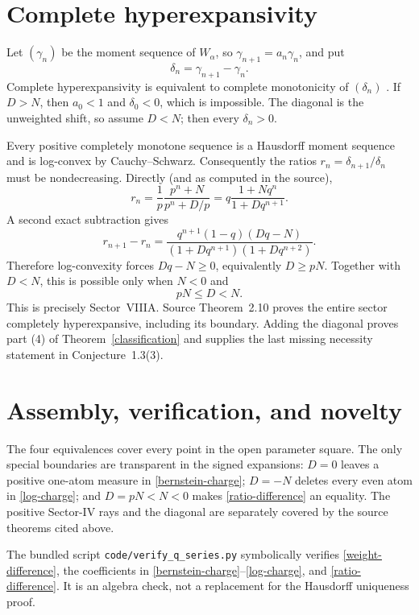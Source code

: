 \documentclass[11pt]{article}
\begin{document}
\section{Complete hyperexpansivity}

Let $(\gamma_n)$ be the moment sequence of $W_\alpha$, so
$\gamma_{n+1}=a_n\gamma_n$, and put
\[
 \delta_n=\gamma_{n+1}-\gamma_n.
\]
Complete hyperexpansivity is equivalent to complete monotonicity of
$(\delta_n)$ \cite[Theorem~2.10 and its preliminaries]{GRWS}.  If $D>N$,
then $a_0<1$ and $\delta_0<0$, which is impossible.  The diagonal is the
unweighted shift, so assume $D<N$; then every $\delta_n>0$.

Every positive completely monotone sequence is a Hausdorff moment sequence
and is log-convex by Cauchy--Schwarz.  Consequently the ratios
$r_n=\delta_{n+1}/\delta_n$ must be nondecreasing.  Directly (and as computed
in the source),
\begin{equation}\label{delta-ratio}
 r_n=\frac1p\frac{p^n+N}{p^n+D/p}
 =q\frac{1+Nq^n}{1+Dq^{n+1}}.
\end{equation}
A second exact subtraction gives
\begin{equation}\label{ratio-difference}
 r_{n+1}-r_n
 =\frac{q^{n+1}(1-q)(Dq-N)}
 {(1+Dq^{n+1})(1+Dq^{n+2})}.
\end{equation}
Therefore log-convexity forces $Dq-N\geq0$, equivalently $D\geq pN$.
Together with $D<N$, this is possible only when $N<0$ and
\[
 pN\leq D<N.
\]
This is precisely Sector~VIIIA.  Source Theorem~2.10 proves the entire sector
completely hyperexpansive, including its boundary.  Adding the diagonal
proves part (4) of Theorem~\ref{classification} and supplies the last missing
necessity statement in Conjecture~1.3(3).

\section{Assembly, verification, and novelty}

The four equivalences cover every point in the open parameter square.  The
only special boundaries are transparent in the signed expansions:
$D=0$ leaves a positive one-atom measure in \eqref{bernstein-charge};
$D=-N$ deletes every even atom in \eqref{log-charge}; and $D=pN<N<0$
makes \eqref{ratio-difference} an equality.  The positive Sector-IV rays and
the diagonal are separately covered by the source theorems cited above.

The bundled script \texttt{code/verify\_q\_series.py} symbolically verifies
\eqref{weight-difference}, the coefficients in
\eqref{bernstein-charge}--\eqref{log-charge}, and
\eqref{ratio-difference}.  It is an algebra check, not a replacement for the
Hausdorff uniqueness proof.
\end{document}
